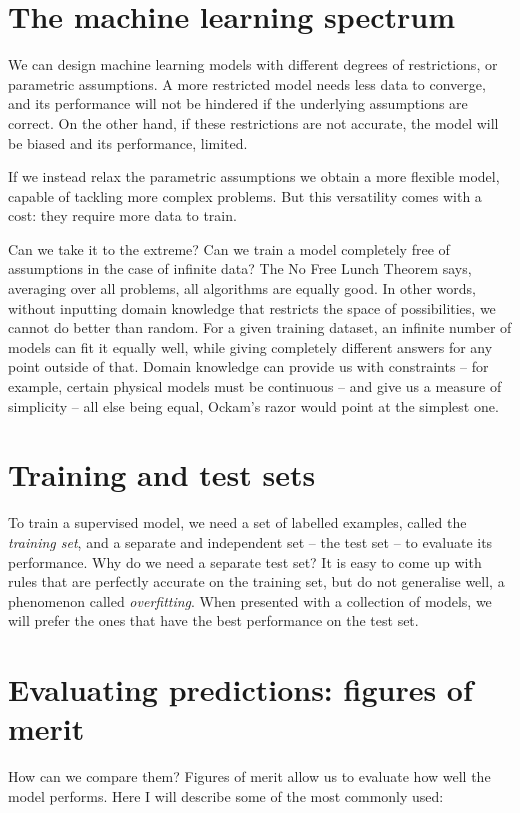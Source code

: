 \section{The machine learning spectrum}
We can design machine learning models with different degrees of restrictions, or parametric assumptions.
A more restricted model needs less data to converge, and its performance will not be hindered if the underlying assumptions are correct.
On the other hand, if these restrictions are not accurate, the model will be biased and its performance, limited.

If we instead relax the parametric assumptions we obtain a more flexible model, capable of tackling more complex problems.
But this versatility comes with a cost: they require more data to train.

Can we take it to the extreme?
Can we train a model completely free  of assumptions in the case of infinite data? The No Free Lunch Theorem \citep{no_free_lunch} says, averaging over all problems, all algorithms are equally good.
In other words, without inputting domain knowledge that restricts the space of possibilities, we cannot do better than random.
For a given training dataset, an infinite number of models can fit it equally well, while giving completely different answers for any point outside of that.
Domain knowledge can provide us with constraints -- for example, certain physical models must be continuous -- and give us a measure of simplicity -- all else being equal, Ockam's razor would point at the simplest one.

\section{Training and test sets}
To train a supervised model, we need a set of labelled examples, called the \emph{training set},
and a separate and independent set -- the test set -- to evaluate its performance.
Why do we need a separate test set?
It is easy to come up with rules that are perfectly accurate on the training set, but do not generalise well, a phenomenon called \emph{overfitting}.
When presented with a collection of models, we will prefer the ones that have the best performance on the test set.

\section{Evaluating predictions: figures of merit}
How can we compare them?
Figures of merit allow us to evaluate how well the model performs.
Here I will describe some of the most commonly used:

